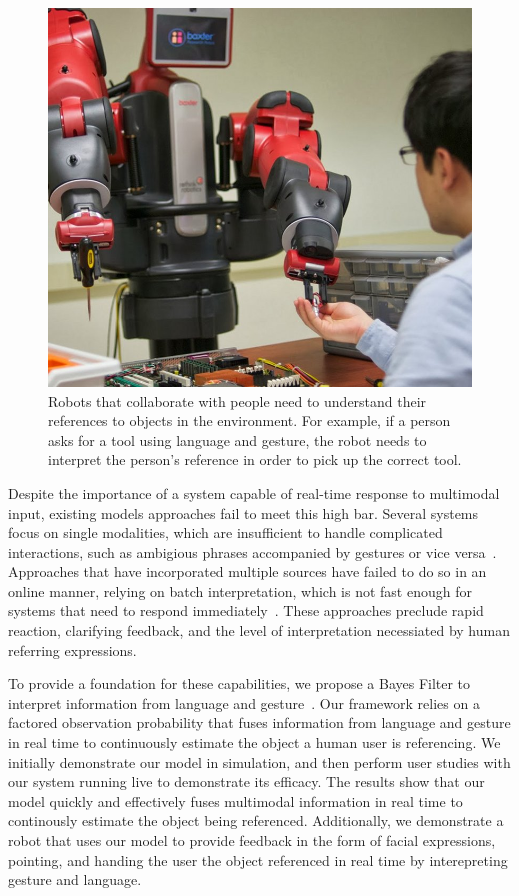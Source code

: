 \documentclass[a4paper, 11pt]{article} %
\begin{document}
\begin{figure}
\centering
\includegraphics[width=0.3\linewidth]{images/baxter_scene_cropped.jpg}
\caption{Robots that collaborate with people need to understand their
  references to objects in the environment.  For example, if a person
  asks for a tool using language and gesture, the robot needs to
  interpret the person's reference in order to pick up the correct
  tool.\label{fig:example}}
\end{figure}

Despite the importance of a system capable of real-time response to multimodal input, existing models approaches fail to meet this high bar. Several systems focus on single modalities, which are insufficient to handle complicated interactions, such as ambigious phrases accompanied by gestures or vice versa~\citep{tellex11, kollar10}. Approaches that have incorporated multiple sources have failed to do so in an online manner, relying on batch interpretation, which is not fast enough for systems that need to respond immediately~\citep{matuszek14}. These approaches preclude rapid reaction, clarifying feedback, and the level of interpretation necessiated by human referring expressions.

To provide a foundation for these capabilities, we propose a Bayes Filter to interpret information from language and gesture~\citep{thrun08}. Our framework relies on a factored observation probability that fuses information from language and gesture in real time to continuously estimate the object a human user is referencing. We initially demonstrate our model in simulation, and then perform user studies with our system running live to demonstrate its efficacy. The results show that our model quickly and effectively fuses multimodal information in real time to continously estimate the object being referenced. Additionally, we demonstrate a robot that uses our model to provide feedback in the form of facial expressions, pointing, and handing the user the object referenced in real time by interepreting gesture and language.
\end{document}
